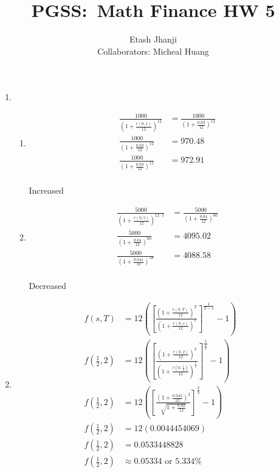 \documentclass[11pt,letterpaper]{article}
\author{Etash Jhanji\\\small Collaborators: Micheal Huang}
\title{PGSS:\ Math Finance HW 5}
\date{}
\begin{document}
\maketitle
\begin{enumerate}
    \item \begin{enumerate}
        \item \begin{align*}
            \frac{1000}{(1+\frac{r(0,1)}{12})^{12}} &= \frac{1000}{(1+\frac{0.03}{12})^{12}}\\
            \frac{1000}{(1+\frac{0.03}{12})^{12}} &= 970.48\\
            \frac{1000}{(1+\frac{0.03}{12})^{11}} &= 972.91\\
        \end{align*}
        \begin{center}Increased\end{center}
        \item \begin{align*}
            \frac{5000}{(1+\frac{r(0,5)}{12})^{12 \cdot 5}} &= \frac{5000}{(1+\frac{0.04}{12})^{60}}\\
            \frac{5000}{(1+\frac{0.04}{12})^{60}} &= 4095.02\\
            \frac{5000}{(1+\frac{0.041}{12})^{59}} &= 4088.58            \\
        \end{align*}
        \begin{center}Decreased\end{center}
    \end{enumerate}
    \item \begin{align*}
        f(s,T) &= 12{\left( \left[ \frac{(1+ \frac{r(0,T)}{12})^T}{(1+ \frac{r(0,s)}{12})^s} \right]^{\frac{1}{T-s}}-1 \right)}\\
        f\left(\frac{1}{2},2\right) &= 12{\left( \left[ \frac{\left(1+ \frac{r(0,2)}{12}\right)^2}{\left(1+ \frac{r\left(0,\frac{1}{2}\right)}{12}\right)^\frac{1}{2}} \right]^{\frac{1}{\frac{3}{2}}}-1 \right)}\\
        f\left(\frac{1}{2},2\right) &= 12{\left( \left[ \frac{(1+ \frac{0.045}{12})^2}{\sqrt{1+ \frac{0.02}{12}}} \right]^{\frac{2}{3}}-1 \right)}\\
        f\left(\frac{1}{2},2\right) &= 12(0.0044454069)\\
        f\left(\frac{1}{2},2\right) &= 0.0533448828\\
        f\left(\frac{1}{2},2\right) &\approx 0.05334 \text{ or } 5.334\%
    \end{align*}
\end{enumerate}
\end{document}
